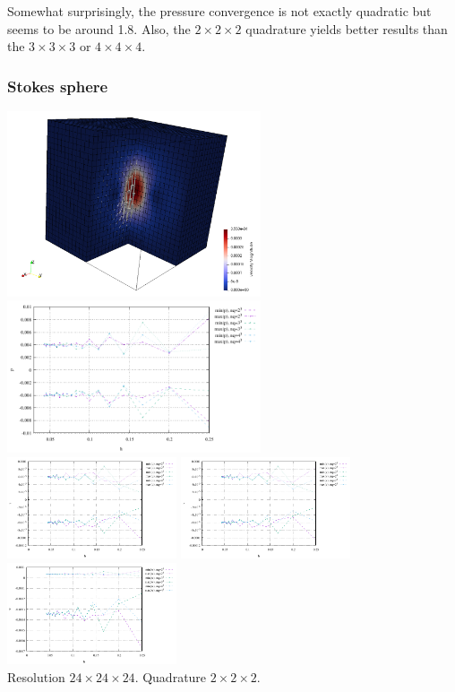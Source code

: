 Somewhat surprisingly, the pressure convergence is not exactly quadratic but seems to be
around 1.8. Also, the $2\times 2\times 2$ 
quadrature yields better results than the $3\times 3\times 3$ or $4\times 4 \times 4$.

\subsubsection*{Stokes sphere}

\begin{center}
\includegraphics[width=7.5cm]{python_codes/fieldstone_82/results/sphere/vel}
\includegraphics[width=7.5cm]{python_codes/fieldstone_82/results/sphere/p}\\
\includegraphics[width=5cm]{python_codes/fieldstone_82/results/sphere/u}
\includegraphics[width=5cm]{python_codes/fieldstone_82/results/sphere/v}
\includegraphics[width=5cm]{python_codes/fieldstone_82/results/sphere/w}\\
{\captionfont Resolution $24\times 24\times 24$. Quadrature $2\times 2 \times 2$.}
\end{center}


